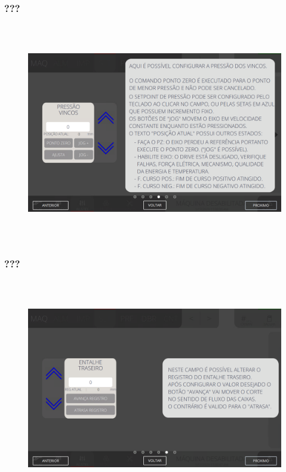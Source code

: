 \newpage
\thispagestyle{fancy}
\vspace*{\fill}
\subsubsection{\small{???}}
\begin{figure}[h]
  \centering
  \includegraphics[width=576px,height=360px]{src/imagesFlexo/05-slotter/settings/e-4.png}
   \label{}
\end{figure}
\vspace*{\fill}

\newpage
\thispagestyle{fancy}
\vspace*{\fill}
\subsubsection{\small{???}}
\begin{figure}[h]
  \centering
  \includegraphics[width=576px,height=360px]{src/imagesFlexo/05-slotter/settings/e-5.png}
   \label{}
\end{figure}
\vspace*{\fill}


